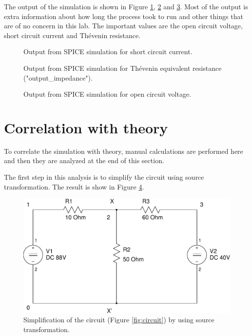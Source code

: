 \documentclass{article}
\begin{document}
The output of the simulation is shown in Figure \ref{fig:out1}, \ref{fig:out2} and \ref{fig:out3}.
Most of the output is extra information about how long the process took
to run and other things that are of no concern in this lab.
The important values are the open circuit voltage,
short circuit current and Th\'{e}venin resistance.

\begin{figure}[!hbtp]

\caption{Output from SPICE simulation for short circuit current.}
\label{fig:out1}
\end{figure}

\begin{figure}[!hbtp]

\caption{Output from SPICE simulation for Th\'{e}venin equivalent
resistance ("output\_impedance").}
\label{fig:out2}
\end{figure}

\begin{figure}[!hbtp]

\caption{Output from SPICE simulation for open circuit voltage.}
\label{fig:out3}
\end{figure}

\clearpage


\section{Correlation with theory}

To correlate the simulation with theory, manual calculations are
performed here and then they are analyzed at the end of this section.

The first step in this analysis is to simplify the circuit using
source transformation.  The result is show in Figure \ref{fig:circuit-02}.

\begin{figure}[!hbtp]
\center
\includegraphics[scale=0.5]{spice/circuit-02}
\caption{Simplification of the circuit (Figure \ref{fig:circuit})
by using source transformation.}
\label{fig:circuit-02}
\end{figure}
\end{document}
